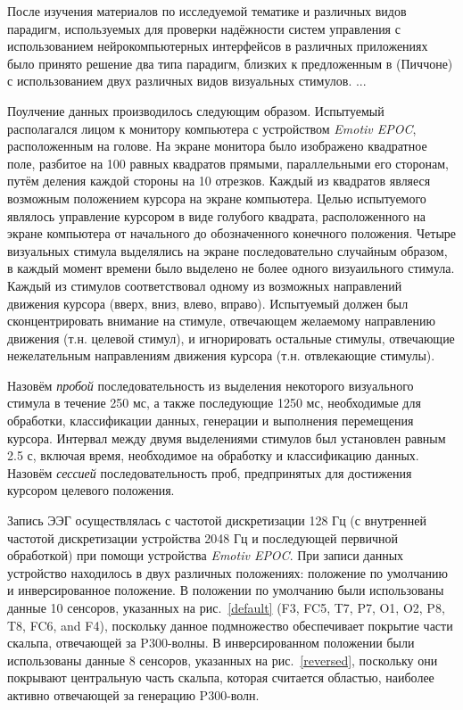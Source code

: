 \documentclass[12pt,fleqn]{article}
\begin{document}
	\par После изучения материалов по исследуемой тематике и различных видов парадигм, используемых для проверки надёжности систем управления с использованием нейрокомпьютерных интерфейсов в различных приложениях было принято решение два типа парадигм, близких к предложенным в (Пиччоне) с использованием двух различных видов визуальных стимулов. ...
	\par Поулчение данных производилось следующим образом. Испытуемый располагался лицом к монитору компьютера с устройством {\it Emotiv EPOC}, расположенным на голове. На экране монитора было изображено квадратное поле, разбитое на 100 равных квадратов прямыми, параллельными его сторонам, путём деления каждой стороны на 10 отрезков. Каждый из квадратов являеся возможным положением курсора на экране компьютера. Целью испытуемого являлось управление курсором в виде голубого квадрата, расположенного на экране компьютера от начального до обозначенного конечного положения. Четыре визуальных стимула выделялись на экране последовательно случайным образом, в каждый момент времени было выделено не более одного визуаильного стимула. Каждый из стимулов соответствовал одному из возможных направлений движения курсора (вверх, вниз, влево, вправо). Испытуемый должен был сконцентрировать внимание на стимуле, отвечающем желаемому направлению движения (т.н. целевой стимул), и игнорировать остальные стимулы, отвечающие нежелательным направлениям движения курсора (т.н. отвлекающие стимулы).
	\par Назовём {\it пробой} последовательность из выделения некоторого визуального стимула в течение 250 мс, а также последующие 1250 мс, необходимые для обработки, классификации данных, генерации и выполнения перемещения курсора. Интервал между двумя выделениями стимулов был установлен равным 2.5 с, включая время, необходимое на обработку и классификацию данных. Назовём {\it сессией} последовательность проб, предпринятых для достижения курсором целевого положения.
	\par Запись ЭЭГ осуществлялась с частотой дискретизации 128 Гц (с внутренней частотой дискретизации устройства 2048 Гц и последующей первичной обработкой) при помощи устройства {\it Emotiv EPOC}. При записи данных устройство находилось в двух различных положениях: положение по умолчанию и инверсированное положение. В положении по умолчанию были использованы данные 10 сенсоров, указанных на рис.~\ref{default} (F3, FC5, T7, P7, O1, O2, P8, T8, FC6, and F4), поскольку данное подмножество обеспечивает покрытие части скальпа, отвечающей за P300-волны. В инверсированном положении были использованы данные 8 сенсоров, указанных на рис.~\ref{reversed}, поскольку они покрывают центральную часть скальпа, которая считается областью, наиболее активно отвечающей за генерацию P300-волн.
\end{document}
